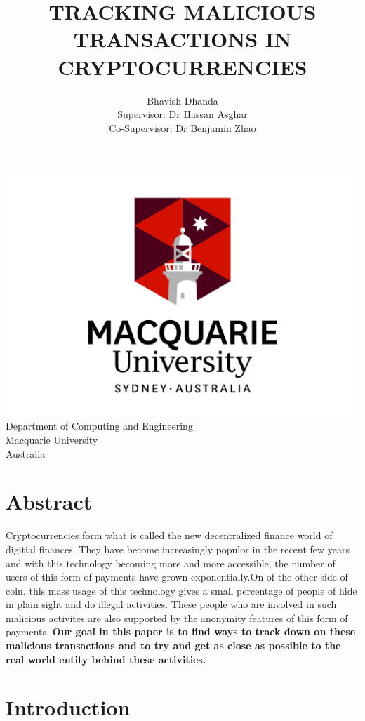 \documentclass{article}
\begin{document}
\begin{titlepage}
\title{TRACKING MALICIOUS TRANSACTIONS IN CRYPTOCURRENCIES}
\author{Bhavish Dhanda {\\ Supervisor: Dr Hassan Asghar} {\\ Co-Supervisor: Dr Benjamin Zhao}}
\date{}
\end{titlepage}
\maketitle
\begin{center}
    \includegraphics[width=0.7\linewidth]{logo.jpg}\\[4ex]
    Department of Computing and Engineering\\
    Macquarie University\\
    Australia
\end{center}
\pagebreak
\tableofcontents
\pagebreak
\listoffigures
\lstlistoflistings
\pagebreak

\section{Abstract}
Cryptocurrencies form what is called the new decentralized finance world of digitial finances. They have become increasingly populor in the recent few years and with this technology becoming more and more accessible, the number of users of this form of payments have grown exponentially.On of the other side of coin, this mass usage of this technology gives a small percentage of people of hide in plain sight and do illegal activities. These people who are involved in such malicious activites are also supported by the anonymity features of this form of payments. \textbf{Our goal in this paper is to find ways to track down on these malicious transactions and to try and get as close as possible to the real world entity behind these activities.}
\pagebreak
\section{Introduction}
\end{document}
